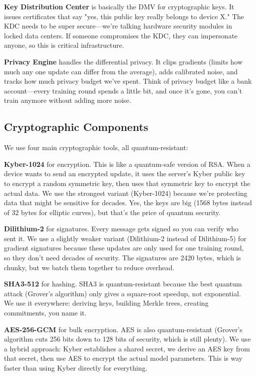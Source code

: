 \documentclass[journal,onecolumn]{IEEEtran}
\begin{document}
\textbf{Key Distribution Center} is basically the DMV for cryptographic keys. It issues certificates that say "yes, this public key really belongs to device X." The KDC needs to be super secure—we're talking hardware security modules in locked data centers. If someone compromises the KDC, they can impersonate anyone, so this is critical infrastructure.

\textbf{Privacy Engine} handles the differential privacy. It clips gradients (limits how much any one update can differ from the average), adds calibrated noise, and tracks how much privacy budget we've spent. Think of privacy budget like a bank account—every training round spends a little bit, and once it's gone, you can't train anymore without adding more noise.

\subsection{Cryptographic Components}

We use four main cryptographic tools, all quantum-resistant:

\textbf{Kyber-1024} for encryption. This is like a quantum-safe version of RSA. When a device wants to send an encrypted update, it uses the server's Kyber public key to encrypt a random symmetric key, then uses that symmetric key to encrypt the actual data. We use the strongest variant (Kyber-1024) because we're protecting data that might be sensitive for decades. Yes, the keys are big (1568 bytes instead of 32 bytes for elliptic curves), but that's the price of quantum security.

\textbf{Dilithium-2} for signatures. Every message gets signed so you can verify who sent it. We use a slightly weaker variant (Dilithium-2 instead of Dilithium-5) for gradient signatures because these updates are only used for one training round, so they don't need decades of security. The signatures are 2420 bytes, which is chunky, but we batch them together to reduce overhead.

\textbf{SHA3-512} for hashing. SHA3 is quantum-resistant because the best quantum attack (Grover's algorithm) only gives a square-root speedup, not exponential. We use it everywhere: deriving keys, building Merkle trees, creating commitments, you name it.

\textbf{AES-256-GCM} for bulk encryption. AES is also quantum-resistant (Grover's algorithm cuts 256 bits down to 128 bits of security, which is still plenty). We use a hybrid approach: Kyber establishes a shared secret, we derive an AES key from that secret, then use AES to encrypt the actual model parameters. This is way faster than using Kyber directly for everything.
\end{document}
